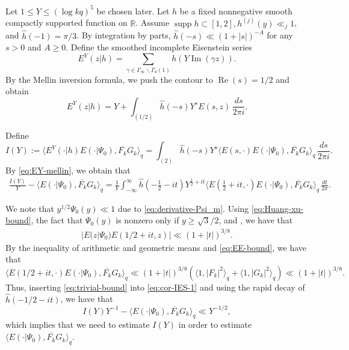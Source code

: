 \documentclass[12pt,reqno]{amsart}
\theoremstyle{remark}
\newcommand{\bs}{\backslash}
\DeclareMathOperator{\Real}{Re}
\DeclareMathOperator{\Imag}{Im}
\DeclareMathOperator{\supp}{supp}
\numberwithin{equation}{section}
\begin{document}
        
        Let $1 \le Y \le (\log kq)^5$ be chosen later. 
		Let $h$ be a fixed nonnegative smooth compactly supported function on $\mathbb{R}$. Assume $\supp h \subset [1,2], h^{(j)}(y) \ll_j 1$, and $\widehat{h}(-1) = \pi/3$. By integration by parts, $\widehat{h}(-s) \ll (1+|s|)^{-A}$ for any $s > 0$ and $A \ge 0$. Define the smoothed incomplete Eisenstein series
		\[
		E^Y(z|h) = \sum_{\gamma \in \Gamma_\infty \bs \Gamma_0(1)} h(Y\Imag(\gamma z)).
		\]
		By the Mellin inversion formula, we push the contour to $\Real(s) = 1/2$ and obtain 
	\begin{equation}\label{eq:EY-mellin}
			E^Y(z|h) = Y + \int_{(1/2)}\widehat{h}(-s)Y^s E(s, z) \,\frac{ds}{2\pi i}.
	\end{equation}
		
        Define 
		\[
		I(Y) := \langle E^Y(\cdot| h)E(\cdot|\Psi_0), \overline{F_k}G_k\rangle_q = \int_{(2)}\widehat{h}(-s)Y^s \langle E(s, \cdot)E(\cdot | \Psi_0), \overline{F_k}G_k \rangle_q \,\frac{ds}{2\pi i}.
		\]
        By  \eqref{eq:EY-mellin}, we obtain that \begin{multline}\label{eq:cor-IES-1}
				\frac{I(Y)}{Y} -  \langle E(\cdot | \Psi_0), \overline{F_k}G_k \rangle_q = \frac{1}{Y}\int_{-\infty}^{\infty}\widehat{h}(-\tfrac{1}{2}-it)Y^{\frac{1}{2}+it} \langle E(\tfrac{1}{2}+it, \cdot)E(\cdot | \Psi_0), \overline{F_k}G_k \rangle_q \,\frac{dt}{2\pi}.
		\end{multline}
  
 We note that $y^{1/2}\Psi_0(y) \ll 1$ due to \eqref{eq:derivative-Psi_m}. Using \eqref{eq:Huang-xu-bound}, the fact that $\Psi_0(y)$ is nonzero only  if $y \ge \sqrt{3}/{2}$, and \cite[Lemma 2.10]{Iw}, we have that
		\begin{equation}
                \label{eq:EE-bound}
			\begin{aligned}
				|E(z |\Psi_0)E(1/2+it, z)| \ll (1+|t|)^{3/8}.
			\end{aligned}
		\end{equation}
       By the inequality of arithmetic and geometric means and \eqref{eq:EE-bound}, we have that
	\begin{equation}\label{eq:trivial-bound}
		\langle E(1/2+it, \cdot) E(\cdot | \Psi_0), \overline{F_k}G_k \rangle_q \ll (1+|t|)^{3/8}(\langle 1, |F_k|^2 \rangle_q+\langle 1, |G_k|^2 \rangle_q) \ll (1+|t|)^{3/8}.  
		\end{equation}
		Thus, inserting \eqref{eq:trivial-bound} into \eqref{eq:cor-IES-1} and using the rapid decay of $\widehat{h}(-1/2-it)$, we have that 
        \begin{equation}\label{eq:cor-IES-2}
		  I(Y)Y^{-1} -  \langle E(\cdot | \Psi_0), \overline{F_k}G_k \rangle_q 
            \ll Y^{-1/2},
		\end{equation}
        which implies that  we need to estimate $I(Y)$ in order to estimate $\langle E(\cdot | \Psi_0), \overline{F_k}G_k \rangle_q$. 
\end{document}
